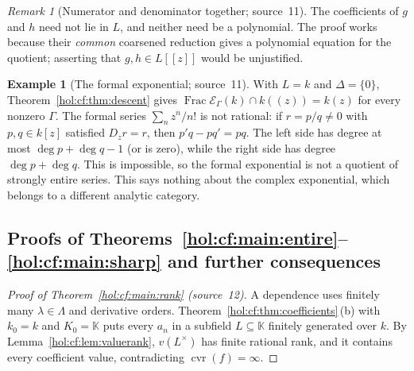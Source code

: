 \documentclass[11pt]{article}
\numberwithin{equation}{section}
\theoremstyle{definition}
\newtheorem{example}[theorem]{Example}
\theoremstyle{remark}
\newtheorem{remark}[theorem]{Remark}
\newcommand{\KK}{\mathbb K}
\newcommand{\EK}{\mathcal E_\Gamma(k)}
\newcommand{\FE}{\operatorname{Frac}\EK}
\newcommand{\cvr}{\operatorname{cvr}}
\begin{document}
\begin{remark}[Numerator and denominator together; source~11]
The coefficients of $g$ and $h$ need not lie in $L$, and neither need be a
polynomial. The proof works because their \emph{common} coarsened reduction
gives a polynomial equation for the quotient; asserting that $g,h\in L[[z]]$
would be unjustified.
\end{remark}

\begin{example}[The formal exponential; source~11]
With $L=k$ and $\Delta=\{0\}$, Theorem~\ref{hol:cf:thm:descent} gives
$\FE\cap k((z))=k(z)$ for every nonzero $\Gamma$. The formal series
$\sum_nz^n/n!$ is not rational: if $r=p/q\ne0$ with $p,q\in k[z]$
satisfied $D_zr=r$, then $p'q-pq'=pq$. The left side has degree at most
$\deg p+\deg q-1$ (or is zero), while the right side has degree
$\deg p+\deg q$. This is impossible, so the formal exponential is not a
quotient of strongly entire series. This says nothing about the complex
exponential, which belongs to a different analytic category.
\end{example}

\subsection{Proofs of Theorems~\ref{hol:cf:main:entire}--\ref{hol:cf:main:sharp}
and further consequences}\label{hol:cf:sub:proofs}

\begin{proof}[Proof of Theorem~\ref{hol:cf:main:rank} \textup{(source~12)}]
A dependence uses finitely many $\lambda\in\Lambda$ and derivative orders.
Theorem~\ref{hol:cf:thm:coefficients}\,(b) with $k_0=k$ and $K_0=\KK$ puts
every $a_n$ in a subfield $L\subseteq\KK$ finitely generated over $k$. By
Lemma~\ref{hol:cf:lem:valuerank}, $v(L^\times)$ has finite rational rank, and
it contains every coefficient value, contradicting $\cvr(f)=\infty$.
\end{proof}
\end{document}

